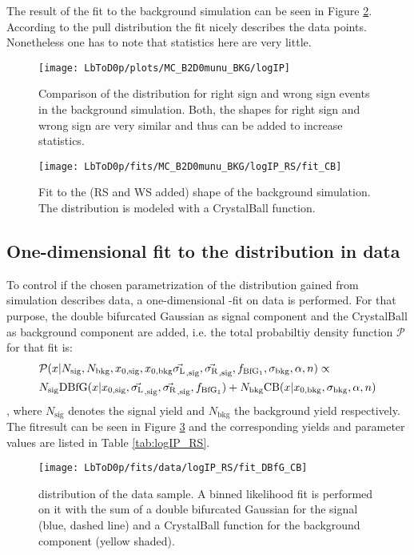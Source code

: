 The result of the fit to the background simulation can be seen in Figure \ref{fig:fit_logIP_MC_BKG}.
According to the pull distribution the fit nicely describes the data points.
Nonetheless one has to note that statistics here are very little.
\begin{figure}[tb]
    \centering
	\texttt{[image: LbToD0p/plots/MC\_B2D0munu\_BKG/logIP]}
	\caption{Comparison of the \logIP distribution for right sign and wrong sign events in the background simulation. Both, the shapes for right sign and wrong sign are very similar and thus can be added to increase statistics.}
    \label{fig:plot_logIP_MC_BKG}
\end{figure}
\begin{figure}[tb]
    \centering
	\texttt{[image: LbToD0p/fits/MC\_B2D0munu\_BKG/logIP\_RS/fit\_CB]}
	\caption{Fit to the (RS and WS added) \logIP shape of the background simulation.
             The distribution is modeled with a CrystalBall function.}
    \label{fig:fit_logIP_MC_BKG}
\end{figure}

\subsection{One-dimensional fit to the \logIP distribution in data}
\label{sec:ControlLogIP}
To control if the chosen parametrization of the \logIP distribution gained from simulation describes data, a one-dimensional \logIP-fit on data is performed.
For that purpose, the double bifurcated Gaussian as signal component and the CrystalBall as background component are added, i.e. the total probabiltiy density function $\mathcal{P}$ for that fit is:
\begin{align}
    &\mathcal{P}(x|N_\text{sig}, N_\text{bkg}, x_{0, \text{sig}}, x_{0, \text{bkg}} \vec{\sigma_{\text{L}_{}}}_{,\text{sig}}, \vec{\sigma_{\text{R}_{}}}_{,\text{sig}}, f_{\text{BfG}_1}, \sigma_\text{bkg}, \alpha, n) \propto \nonumber\\
    &N_\text{sig} \text{DBfG}(x|x_{0, \text{sig}}, \vec{\sigma_{\text{L}_{}}}_{,\text{sig}}, \vec{\sigma_{\text{R}_{}}}_{,\text{sig}}, f_{\text{BfG}_1}) + N_\text{bkg} \text{CB}(x| x_{0, \text{bkg}}, \sigma_\text{bkg}, \alpha, n)
\end{align},
where $N_\text{sig}$ denotes the signal yield and $N_\text{bkg}$ the background yield respectively.
The fitresult can be seen in Figure \ref{fig:fit_logIP_RS} and the corresponding yields and parameter values are listed in Table \ref{tab:logIP_RS}.
\begin{figure}[tb]
    \centering
	\texttt{[image: LbToD0p/fits/data/logIP\_RS/fit\_DBfG\_CB]}
	\caption{\logIP distribution of the data sample.
             A binned likelihood fit is performed on it with the sum of a double bifurcated Gaussian for the signal (blue, dashed line) and a CrystalBall function for the background component (yellow shaded). }
    \label{fig:fit_logIP_RS}
\end{figure}


